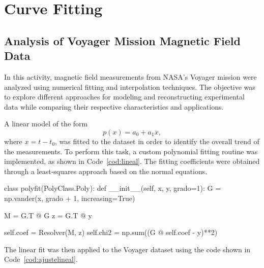 \documentclass[../portafolio.tex]{subfiles}
\begin{document}
\section{Curve Fitting}   %


\medskip


\subsection{Analysis of Voyager Mission Magnetic Field Data}

In this activity, magnetic field measurements from NASA's Voyager mission were analyzed using numerical fitting and interpolation techniques. The objective was to explore different approaches for modeling and reconstructing experimental data while comparing their respective characteristics and applications.

A linear model of the form
\[
p(x) = a_0 + a_1x,
\]
where $x = t - t_0$, was fitted to the dataset in order to identify the overall trend of the measurements. To perform this task, a custom polynomial fitting routine was implemented, as shown in Code~\ref{cod:lineal}. The fitting coefficients were obtained through a least-squares approach based on the normal equations.

\begin{listing}
\begin{pythoncode}
class polyfit(PolyClass.Poly):
    def __init__(self, x, y, grado=1):
        G = np.vander(x, grado + 1, increasing=True)
        
        M = G.T @ G
        z = G.T @ y
        
        self.coef = Resolver(M, z)
        self.chi2 = np.sum((G @ self.coef - y)**2)
\end{pythoncode}
\caption{Implementation of a polynomial least-squares fitting routine.}
\label{cod:lineal}
\end{listing}

The linear fit was then applied to the Voyager dataset using the code shown in Code~\ref{cod:ajustelineal}.
\end{document}
